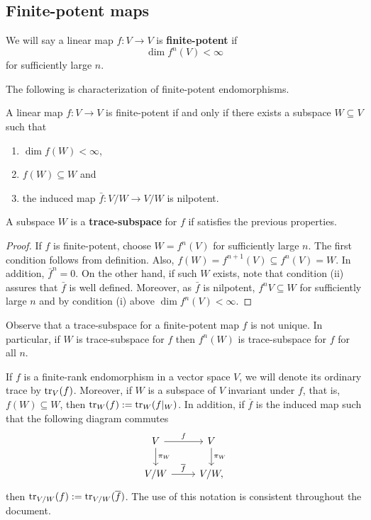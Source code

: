 \subsection{Finite-potent maps}
\begin{definition}\label{def:finite-potent}
	We will say a linear map $f\colon V \to V$ is \textbf{finite-potent} if
	\[
		\dim f^{n}(V) < \infty
	\]
	for sufficiently large $n$.
\end{definition}
The following is characterization of finite-potent endomorphisms.
\begin{lemma}\label{lemm:characterization-of-finite-potent-maps}
	A linear map $f\colon V \to V$ is finite-potent if and only if there exists a subspace $W \subseteq V$ such that
	\begin{enumerate}[label = (\roman*)]
		\item $\dim f(W) < \infty$,
		\item $f(W) \subseteq W$ and
		\item the induced map $\bar{f}\colon V/W \to V/W$ is nilpotent.
	\end{enumerate}
	A subspace $W$ is a \textbf{trace-subspace} for $f$ if satisfies the previous properties.   
\end{lemma}
\begin{proof}
	If $f$ is finite-potent, choose $W = f^{n}(V)$ for sufficiently large $n$. The first condition follows from definition. Also, $f(W) = f^{n+1}(V) \subseteq f^{n}(V) = W$. In addition, $\bar{f}^{n} = 0$. On the other hand, if such $W$ exists, note that condition (ii) assures that $\bar{f}$ is well defined. Moreover, as $\bar{f}$ is nilpotent, $f^{n}V \subseteq W$ for sufficiently large $n$ and by condition (i) above $\dim f^{n}(V) < \infty$.
\end{proof}
Observe that a trace-subspace for a finite-potent map $f$ is not unique. In particular, if $W$ is trace-subspace for $f$ then $f^{n}(W)$ is trace-subspace for $f$ for all $n$.
\begin{notation}\label{not:trace}
	If $f$ is a finite-rank endomorphism in a vector space $V$, we will denote its ordinary trace by $\operatorname{tr}_{V}(f)$. Moreover, if $W$ is a subspace of $V$ invariant under $f$, that is, $f(W) \subseteq W$, then $\operatorname{tr}_{W}(f) := \operatorname{tr}_{W}(f\lvert_{W})$. In addition, if $\overline{f}$ is the induced map such that the following diagram commutes
	\[
	\begin{tikzcd}
		V \arrow[r, "f"] \arrow[d, "\pi_{W}"] & V \arrow[d, "\pi_{W}"] \\
		V/W \arrow[r, "\overline{f}"] & V/W,
	\end{tikzcd} 
	\]
	then $\operatorname{tr}_{V/W}(f) := \operatorname{tr}_{V/W}(\overline{f})$. The use of this notation is consistent throughout the document. 
\end{notation}
